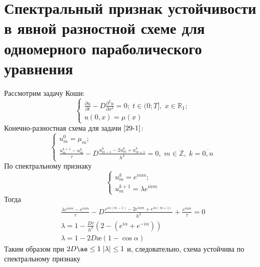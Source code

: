 \documentclass[__main__.tex]{subfiles}
\begin{document}
\section{Спектральный признак устойчивости в явной разностной схеме для одномерного параболического уравнения}

Рассмотрим задачу Коши:
\begin{equation}
	\begin{cases}
	\frac{\partial u}{\partial t} - D \frac{\partial^2 u}{\partial x^2} = 0; \; t \in (0;T], \; x \in \mathbb{R}_1;\\
	u(0, x) = \mu(x)
	\end{cases}
	\label{29-1}
\end{equation}
Конечно-разностная схема для задачи $\ref{29-1}$:
\begin{equation*}
	\begin{cases}
	u^0_m = \mu_m;\\
	\frac{u^{k+1}_m - u^k_m}{\tau} - D\frac{u^k_{m-1} - 2u^k_m + u^k_{m+1}}{h^2} = 0, \; m \in \mathbb{Z}, \; k = \overline{0, n}
	\end{cases}
\end{equation*}
По спектральному признаку 
\begin{equation*}
	\begin{cases}
	u^k_m = e^{i \alpha m};\\
	u^{k+1}_m = \lambda e^{i \alpha m}
	\end{cases}
\end{equation*}
Тогда
\begin{gather*}
\frac{\lambda e^{i \alpha m} - e^{i \alpha m}}{\tau} - D \frac{e^{i \alpha (m-1)} - 2e^{i \alpha m} + e^{i \alpha (m+1)}}{h^2} + \frac{e^{i \alpha m}}{\tau} = 0\\
\lambda = 1 - \frac{D\tau}{h^2}(2 - (e^{i \alpha} + e^{-i \alpha}))\\
\lambda = 1 - 2D\text{\ae}(1 - \cos{\alpha})
\end{gather*}
Таким образом при $2D\ae \le 1 \; |\lambda| \le 1$ и, следовательно, схема устойчива по спектральному признаку 
\end{document}
